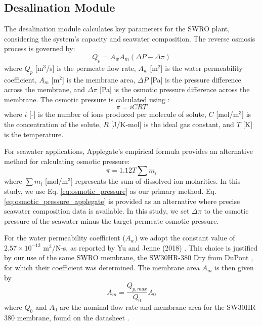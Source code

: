 \documentclass[twocolumn,10pt]{asme2e}
\begin{document}
\subsection{Desalination Module}
The desalination module calculates key parameters for the SWRO plant, considering the system's capacity and seawater composition. The reverse osmosis process is governed by:
\begin{equation}
    \label{eq:ro}
    Q_p = A_w A_m (\Delta P - \Delta \pi)
\end{equation}
\noindent where $Q_p$ [m$^3$/s] is the permeate flow rate, $A_w$ [m$^2$] is the water permeability coefficient, $A_m$ [m$^2$] is the membrane area, $\Delta P$ [Pa] is the pressure difference across the membrane, and $\Delta \pi$ [Pa] is the osmotic pressure difference across the membrane. The osmotic pressure is calculated using \cite{separationprocesses}:
\begin{equation}
    \label{eq:osmotic_pressure}
    \pi = iCRT
\end{equation}
\noindent where $i$ [-] is the number of ions produced per molecule of solute, $C$ [mol/m$^3$] is the concentration of the solute, $R$ [J/K-mol] is the ideal gas constant, and $T$ [K] is the temperature.

For seawater applications, Applegate's empirical formula \cite{separationprocesses} provides an alternative method for calculating osmotic pressure:
\begin{equation}
    \label{eq:osmotic_pressure_applegate}
    \pi = 1.12 T \sum m_i
\end{equation}
\noindent where $\sum m_i$ [mol/m$^3$] represents the sum of dissolved ion molarities. In this study, we use Eq. \ref{eq:osmotic_pressure} as our primary method. Eq. \ref{eq:osmotic_pressure_applegate} is provided as an alternative where precise seawater composition data is available. In this study, we set $\Delta \pi$ to the osmotic pressure of the seawater minus the target permeate osmotic pressure.

For the water permeability coefficient ($A_w$) we adopt the constant value of $2.57\times10^{-12}$ m$^3$/N-s, as reported by Yu and Jenne (2018) \cite{Yu2018}. This choice is justified by our use of the same SWRO membrane, the SW30HR-380 Dry from DuPont \cite{SW30HR380}, for which their coefficient was determined. The membrane area $A_m$ is then given by
\begin{equation}
    A_m = \frac{Q_{p,max}}{Q_0}A_0
    \label{eq:membrane_area}
\end{equation}   
\noindent where $Q_0$ and $A_0$ are the nominal flow rate and membrane area for the SW30HR-380 membrane, found on the datasheet \cite{SW30HR380}.
\end{document}
